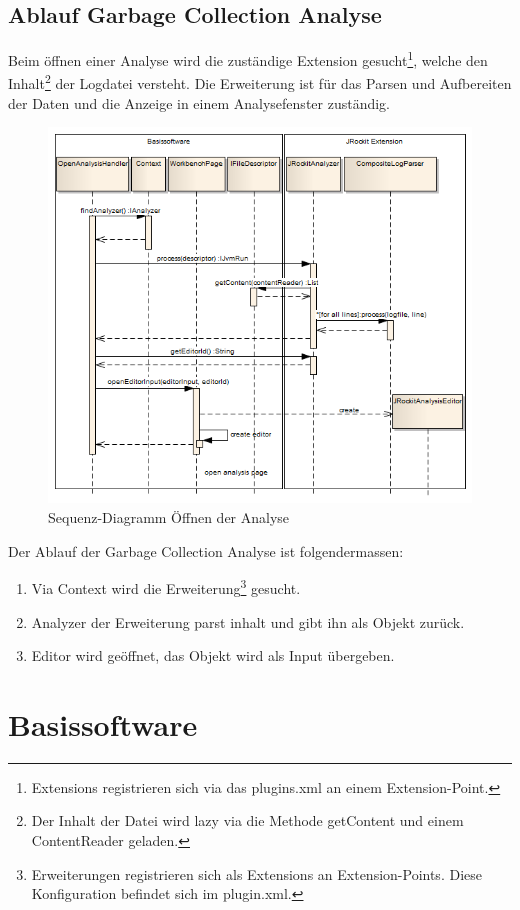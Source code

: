 \subsection{Ablauf Garbage Collection Analyse}
Beim öffnen einer Analyse wird die zuständige Extension gesucht\footnote{Extensions registrieren sich via das plugins.xml an einem Extension-Point. }, welche den Inhalt\footnote{Der Inhalt der Datei wird lazy via die Methode getContent und einem ContentReader geladen.} der Logdatei versteht. Die Erweiterung ist für das Parsen und Aufbereiten der Daten und die Anzeige in einem Analysefenster zuständig. 
 \begin{figure}[H]
  	\centering
    	\includegraphics[width=16cm]{images/core_sequence_analysis}
	\caption{Sequenz-Diagramm Öffnen der Analyse}
\end{figure}
Der Ablauf der Garbage Collection Analyse ist folgendermassen:
\begin{enumerate}
	\item Via Context wird die Erweiterung\footnote{Erweiterungen registrieren sich als Extensions an Extension-Points. Diese Konfiguration befindet sich im plugin.xml.} gesucht.
	\item Analyzer der Erweiterung parst inhalt und gibt ihn als Objekt zurück.
	\item Editor wird geöffnet, das Objekt wird als Input übergeben.
\end{enumerate}

\section{Basissoftware}
